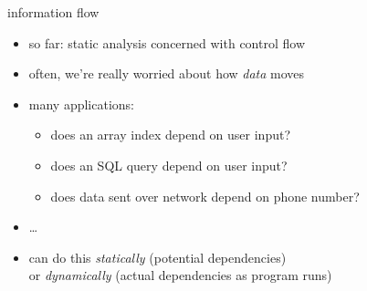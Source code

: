 \begin{frame}{information flow}
    \begin{itemize}
    \item so far: static analysis concerned with control flow
    \item often, we're really worried about how \textit{data} moves
    \vspace{.5cm}
    \item many applications:
        \begin{itemize}
        \item does an array index depend on user input?
        \item does an SQL query depend on user input?
        \item does data sent over network depend on phone number?
        \end{itemize}
    \item \ldots
    \vspace{.5cm}
    \item can do this \textit{statically} (potential dependencies) \\
         or \textit{dynamically} (actual dependencies as program runs)
    \end{itemize}
\end{frame}
